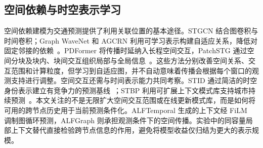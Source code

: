 \subsection{空间依赖与时空表示学习}\label{sec:2_3}

空间依赖建模为交通预测提供了利用关联位置的基本途径。STGCN 结合图卷积与时间卷积；Graph WaveNet 和 AGCRN 利用可学习表示构建自适应关系，降低对固定邻接的依赖~\citep{yu2018spatio,wu2019graph,bai2020adaptive}。PDFormer 将传播时延纳入长程空间交互，PatchSTG 通过空间分块及块内、块间交互组织局部与全局信息~\citep{jiang2023pdformer,fang2025efficient}。这些方法分别改善空间关系、交互范围和计算粒度，但学习到自适应图，并不自动意味着传播会根据每个窗口的观测支持进行调整。空间交互还需与时间表示能力共同考察。STID 通过简洁的时空身份表示建立有竞争力的预测基线~\citep{shao2022spatial}；STBP 利用可扩展上下文模式库支持城市持续预测~\citep{liu2026general}。本文关注的不是无限扩大空间交互范围或在线更新模式库，而是如何将可用的跨节点历史用于当前预测条件化。ALFTemporal 生成的上下文经 FiLM~\citep{perez2018film} 调制图循环预测，ALFGraph 则承担观测条件下的空间传播。实验中的同容量局部上下文替代直接检验跨节点信息的作用，避免将模型收益仅归结为更大的表示规模。
